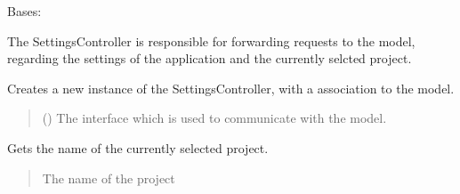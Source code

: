 \documentclass[letterpaper,10pt,english]{sphinxmanual}
\begin{document}
\begin{fulllineitems}
\label{\detokenize{apidoc/src.osm_configurator.control:src.osm_configurator.control.settings_controller.SettingsController}}
\pysigstartsignatures
{}
\pysigstopsignatures
\sphinxAtStartPar
Bases: 

\sphinxAtStartPar
The SettingsController is responsible for forwarding requests to the model, regarding the settings of the application and the currently selcted project.

\begin{fulllineitems}
\label{\detokenize{apidoc/src.osm_configurator.control:src.osm_configurator.control.settings_controller.SettingsController.__init__}}
\pysigstartsignatures
{}
\pysigstopsignatures
\sphinxAtStartPar
Creates a new instance of the SettingsController, with a association to the model.
\begin{quote}\begin{description}
\sphinxAtStartPar
{} ({\hyperref[\detokenize{apidoc/src.osm_configurator.model.application:src.osm_configurator.model.application.application_interface.IApplication}]{}}) \textendash{} The interface which is used to communicate with the model.

\end{description}\end{quote}

\end{fulllineitems}


\begin{fulllineitems}
\label{\detokenize{apidoc/src.osm_configurator.control:src.osm_configurator.control.settings_controller.SettingsController.get_project_name}}
\pysigstartsignatures
{}
\pysigstopsignatures
\sphinxAtStartPar
Gets the name of the currently selected project.
\begin{quote}\begin{description}
\sphinxAtStartPar
The name of the project


\end{description}
\end{quote}
\end{fulllineitems}
\end{fulllineitems}
\end{document}

